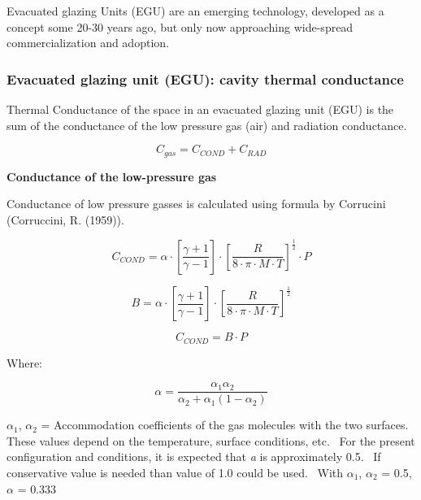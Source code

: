 Evacuated glazing Units (EGU) are an emerging technology, developed as a concept some 20-30 years ago, but only now approaching wide-spread commercialization and adoption.

\subsubsection{Evacuated glazing unit (EGU): cavity thermal conductance}\label{evacuated-glazing-unit-egu-cavity-thermal-conductance}

Thermal Conductance of the space in an evacuated glazing unit (EGU) is the sum of the conductance of the low pressure gas (air) and radiation conductance.

\begin{equation}
{C_{gas}} = {C_{COND}} + {C_{RAD}}
\end{equation}

\textbf{Conductance of the low-pressure gas}

Conductance of low pressure gasses is calculated using formula by Corrucini (Corruccini, R. (1959)).

\begin{equation}
{C_{COND}} = \alpha  \cdot \left[ {\frac{{\gamma  + 1}}{{\gamma  - 1}}} \right] \cdot {\left[ {\frac{R}{{8 \cdot \pi  \cdot M \cdot T}}} \right]^{\frac{1}{2}}} \cdot P
\end{equation}

\begin{equation}
B = \alpha  \cdot \left[ {\frac{{\gamma  + 1}}{{\gamma  - 1}}} \right] \cdot {\left[ {\frac{R}{{8 \cdot \pi  \cdot M \cdot T}}} \right]^{\frac{1}{2}}}
\end{equation}

\begin{equation}
{C_{COND}} = B \cdot P
\end{equation}

Where:

\begin{equation}
\alpha  = \frac{{{\alpha_1}{\alpha_2}}}{{{\alpha_2} + {\alpha_1}\left( {1 - {\alpha_2}} \right)}}
\end{equation}

$\alpha$\(_{1}\), $\alpha$\(_{2}\) = Accommodation coefficients of the gas molecules with the two surfaces.~ These values depend on the temperature, surface conditions, etc.~ For the present configuration and conditions, it is expected that \emph{a} is approximately 0.5.~ If conservative value is needed than value of 1.0 could be used.~ With $\alpha$\(_{1}\), $\alpha$\(_{2}\) = 0.5, $\alpha$ = 0.333

